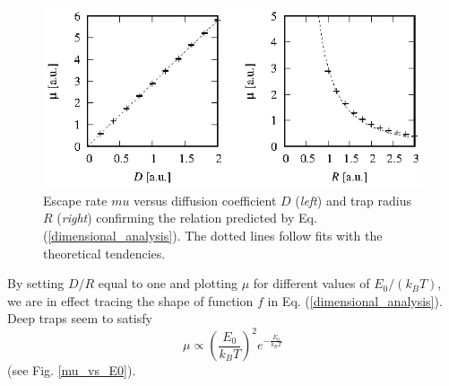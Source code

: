 \documentclass{article}
\begin{document}
\begin{figure}
  \centering
  \includegraphics[width=\linewidth]{mu_vs_D_and_R.eps}
  \caption{\label{mu_vs_D_and_R}Escape rate $mu$ versus diffusion coefficient
           $D$ (\textit{left}) and trap radius $R$ (\textit{right}) confirming
           the relation predicted by Eq. (\ref{dimensional_analysis}). The
           dotted lines follow fits with the theoretical tendencies.}
\end{figure}

By setting $D/R$ equal to one and plotting $\mu$ for different values of
$E_0/(k_BT)$, we are in effect tracing the shape of function $f$ in Eq.
(\ref{dimensional_analysis}). Deep traps seem to satisfy
\begin{equation}
   \mu \propto \left(\frac{E_0}{k_BT}\right)^2 e^{-\frac{E_0}{k_BT}}
\end{equation}
(see Fig. \ref{mu_vs_E0}).

\end{document}
